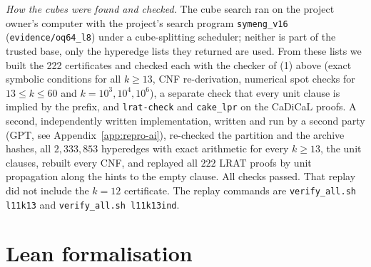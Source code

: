 \documentclass[11pt]{amsart}
\theoremstyle{definition}
\begin{document}
\noindent\emph{How the cubes were found and checked.} The cube search ran on the project owner's computer with the project's search program \texttt{symeng\_v16} (\texttt{evidence/oq64\_l8}) under a cube-splitting scheduler; neither is part of the trusted base, only the hyperedge lists they returned are used. From these lists we built the 222 certificates and checked each with the checker of (1) above (exact symbolic conditions for all $k\ge13$, CNF re-derivation, numerical spot checks for $13\le k\le60$ and $k=10^3,10^4,10^6$), a separate check that every unit clause is implied by the prefix, and \texttt{lrat-check} and \texttt{cake\_lpr} on the CaDiCaL proofs. A second, independently written implementation, written and run by a second party (GPT, see Appendix~\ref{app:repro-ai}), re-checked the partition and the archive hashes, all $2{,}333{,}853$ hyperedges with exact arithmetic for every $k\ge13$, the unit clauses, rebuilt every CNF, and replayed all $222$ LRAT proofs by unit propagation along the hints to the empty clause. All checks passed. That replay did not include the $k=12$ certificate. The replay commands are \texttt{verify\_all.sh l11k13} and \texttt{verify\_all.sh l11k13ind}.

\section{Lean formalisation}\label{sec:lean}
\end{document}
